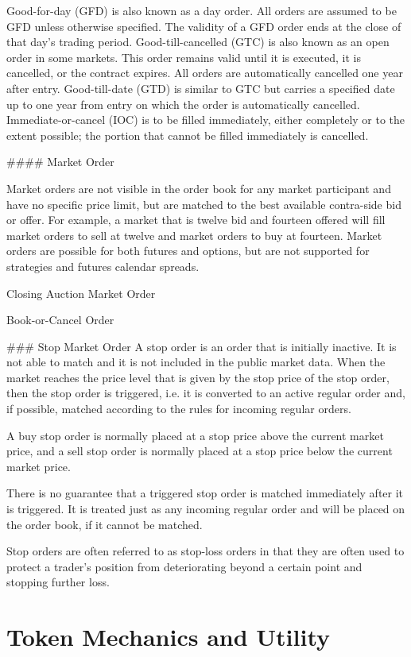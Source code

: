 \documentclass{article}
\begin{document}
Good-for-day (GFD) is also known as a day order. All orders are assumed to be GFD unless otherwise specified. The validity of a GFD order ends at the close of that day's trading period. 
Good-till-cancelled (GTC) is also known as an open order in some markets. This order remains valid until it is executed, it is cancelled, or the contract expires. All orders are automatically cancelled one year after entry.
Good-till-date (GTD) is similar to GTC but carries a specified date up to one year from entry on which the order is automatically cancelled.
Immediate-or-cancel (IOC) is to be filled immediately, either completely or to the extent possible; the portion that cannot be filled immediately is cancelled.


#### Market Order 

Market orders are not visible in the order book for any market participant and have no specific price limit, but are matched to the best available contra-side bid or offer. For example, a market that is twelve bid and fourteen offered will fill market orders to sell at twelve and market orders to buy at fourteen. Market orders are possible for both futures and options, but are not supported for strategies and futures calendar spreads.



Closing Auction Market Order

Book-or-Cancel Order

### Stop Market Order 
A stop order is an order that is initially inactive. It is not able to match and it is not included in the public market data. When the market reaches the price level that is given by the stop price of the stop order, then the stop order is triggered, i.e. it is converted to an active regular order and, if possible, matched according to the rules for incoming regular orders.

A buy stop order is normally placed at a stop price above the current market price, and a sell stop order is normally placed at a stop price below the current market price.

There is no guarantee that a triggered stop order is matched immediately after it is triggered. It is treated just as any incoming regular order and will be placed on the order book, if it cannot be matched.

Stop orders are often referred to as stop-loss orders in that they are often used to protect a trader's position from deteriorating beyond a certain point and stopping further loss.

\section{Token Mechanics and Utility }
\end{document}
